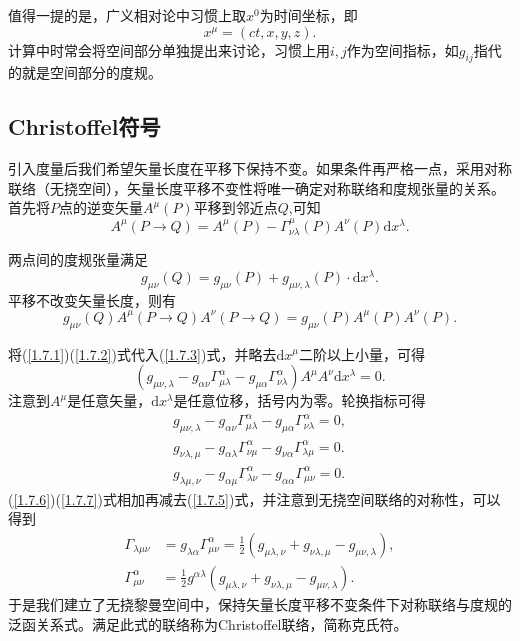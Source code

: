 \documentclass[11pt, a4paper, oneside, onecolumn]{ctexart}
\numberwithin{equation}{subsection}
\begin{document}
值得一提的是，广义相对论中习惯上取$x^{0}$为时间坐标，即
\begin{equation}
x^{\mu}=\left(ct,x,y,z\right).
\end{equation}
计算中时常会将空间部分单独提出来讨论，习惯上用$i,j$作为空间指标，如$g_{ij}$指代的就是空间部分的度规。

\subsection{Christoffel符号}
引入度量后我们希望矢量长度在平移下保持不变。如果条件再严格一点，采用对称联络（无挠空间），矢量长度平移不变性将唯一确定对称联络和度规张量的关系。首先将$P$点的逆变矢量$A^{\mu}\left(P\right)$平移到邻近点$Q$,可知
\begin{equation}
A^{\mu}\left(P\to Q\right)=A^{\mu}\left(P\right)-\Gamma_{\nu\lambda}^{\mu}\left(P\right)A^{\nu}\left(P\right)\mathrm{d}x^{\lambda}.\label{1.7.1}
\end{equation}

两点间的度规张量满足
\begin{equation}
g_{\mu\nu}\left(Q\right)=g_{\mu\nu}\left(P\right)+g_{\mu\nu,\lambda}\left(P\right)\cdot\mathrm{d}x^{\lambda}.\label{1.7.2}
\end{equation}
平移不改变矢量长度，则有
\begin{equation}
g_{\mu\nu}\left(Q\right)A^{\mu}\left(P\to Q\right)A^{\nu}\left(P\to Q\right)=g_{\mu\nu}\left(P\right)A^{\mu}\left(P\right)A^{\nu}\left(P\right).\label{1.7.3}
\end{equation}

将(\ref{1.7.1})(\ref{1.7.2})式代入(\ref{1.7.3})式，并略去$\mathrm{d}x^{\mu}$二阶以上小量，可得
\begin{equation}
\left(g_{\mu\nu,\lambda}-g_{\alpha\nu}\Gamma_{\mu\lambda}^{\alpha}-g_{\mu\alpha}\Gamma_{\nu\lambda}^{\alpha}\right)A^{\mu}A^{\nu}\mathrm{d}x^{\lambda}=0.
\end{equation}
注意到$A^{\mu}$是任意矢量，$\mathrm{d}x^{\lambda}$是任意位移，括号内为零。轮换指标可得
\begin{align}
g_{\mu\nu,\lambda}-g_{\alpha\nu}\Gamma_{\mu\lambda}^{\alpha}-g_{\mu\alpha}\Gamma_{\nu\lambda}^{\alpha}=0,\label{1.7.5}\\
g_{\nu\lambda,\mu}-g_{\alpha\lambda}\Gamma_{\nu\mu}^{\alpha}-g_{\nu\alpha}\Gamma_{\lambda\mu}^{\alpha}=0.\label{1.7.6}\\
g_{\lambda\mu,\nu}-g_{\alpha\mu}\Gamma_{\lambda\nu}^{\alpha}-g_{\alpha\alpha}\Gamma_{\mu\nu}^{\alpha}=0.\label{1.7.7}
\end{align}
(\ref{1.7.6})(\ref{1.7.7})式相加再减去(\ref{1.7.5})式，并注意到无挠空间联络的对称性，可以得到
\begin{align}
\Gamma_{\lambda\mu\nu}&=g_{\lambda\alpha}\Gamma_{\mu\nu}^{\alpha}=\frac{1}{2}\left(g_{\mu\lambda,\nu}+g_{\nu\lambda,\mu}-g_{\mu\nu,\lambda}\right),\\
\Gamma_{\mu\nu}^{\alpha}&=\frac12g^{\alpha\lambda}\left(g_{\mu\lambda,\nu}+g_{\nu\lambda,\mu}-g_{\mu\nu,\lambda}\right).
\end{align}
于是我们建立了无挠黎曼空间中，保持矢量长度平移不变条件下对称联络与度规的泛函关系式。满足此式的联络称为Christoffel联络，简称克氏符。
\end{document}

